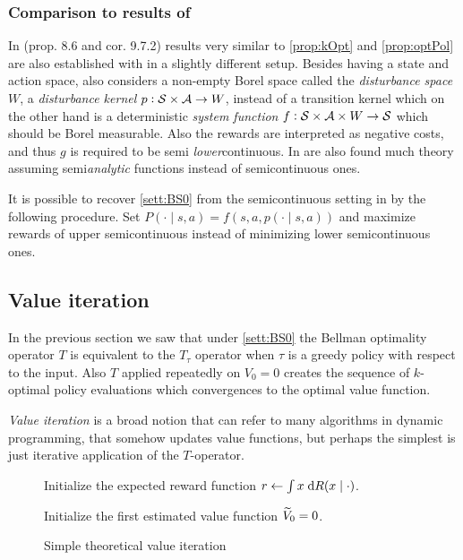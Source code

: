 \subsubsection{Comparison to results of }
In  (prop. 8.6 and cor. 9.7.2) results very similar to
\cref{prop:kOpt} and \cref{prop:optPol} are also established
with in a slightly different setup.
Besides having a state and action space,  also considers a
non-empty Borel space called the
\emph{disturbance space} $W$, a \emph{disturbance kernel}
$p: \mathcal{S} \times \mathcal{A} \to W$,
instead of a transition kernel which on the other hand is a deterministic
\emph{system function} $f : \mathcal{S} \times \mathcal{A} \times W \to \mathcal{S}$
which should be Borel measurable.
Also the rewards are interpreted as negative costs, and thus
$g$ is required to be semi \emph{lower}continuous.
In  are also found much theory assuming semi\emph{analytic}
functions instead of semicontinuous ones.

It is possible to recover \cref{sett:BS0} from the semicontinuous setting
in  by the following procedure.
Set $P(\cdot \mid s, a) = f(s, a, p(\cdot \mid s, a))$
and maximize rewards of upper semicontinuous instead of
minimizing lower semicontinuous ones.


\subsection{Value iteration}

In the previous section we saw that
under \cref{sett:BS0}
the Bellman optimality operator
$T$ is equivalent to the $T_\tau$ operator when $\tau$ is a greedy policy
with respect to the input. Also $T$ applied repeatedly on $V_0 = 0$
creates the sequence of $k$-optimal policy evaluations
which convergences to the optimal value function.

\emph{Value iteration} is a broad notion that can refer to many algorithms
in dynamic programming, that somehow updates value functions,
but perhaps the simplest is just iterative application of the $T$-operator.

\begin{figure}[H]
  \begin{algorithm}[H] 
    \caption{Simple theoretical value iteration}
    Initialize the expected reward function
    $r \leftarrow \int x \; \mathrm{d} R(x \mid \cdot)$.

    Initialize the first estimated value function $\widetilde{V}_0 = 0$.


  \label{alg:valueIteration}
  \end{algorithm}
\end{figure}

